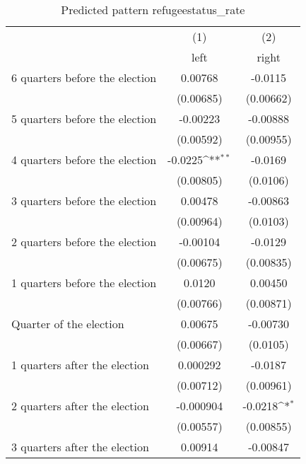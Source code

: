 \begin{table}[htbp]\centering
\def\sym#1{\ifmmode^{#1}\else\(^{#1}\)\fi}
\caption{Predicted pattern refugeestatus\_rate}
\begin{tabular}{l*{2}{c}}
\hline\hline
                    &\multicolumn{1}{c}{(1)}&\multicolumn{1}{c}{(2)}\\
                    &\multicolumn{1}{c}{left}&\multicolumn{1}{c}{right}\\
\hline
 6 quarters before the election&     0.00768         &     -0.0115         \\
                    &   (0.00685)         &   (0.00662)         \\
[1em]
 5 quarters before the election&    -0.00223         &    -0.00888         \\
                    &   (0.00592)         &   (0.00955)         \\
[1em]
 4 quarters before the election&     -0.0225\sym{**} &     -0.0169         \\
                    &   (0.00805)         &    (0.0106)         \\
[1em]
 3 quarters before the election&     0.00478         &    -0.00863         \\
                    &   (0.00964)         &    (0.0103)         \\
[1em]
 2 quarters before the election&    -0.00104         &     -0.0129         \\
                    &   (0.00675)         &   (0.00835)         \\
[1em]
 1 quarters before the election&      0.0120         &     0.00450         \\
                    &   (0.00766)         &   (0.00871)         \\
[1em]
Quarter of the election&     0.00675         &    -0.00730         \\
                    &   (0.00667)         &    (0.0105)         \\
[1em]
 1 quarters after the election&    0.000292         &     -0.0187         \\
                    &   (0.00712)         &   (0.00961)         \\
[1em]
 2 quarters after the election&   -0.000904         &     -0.0218\sym{*}  \\
                    &   (0.00557)         &   (0.00855)         \\
[1em]
 3 quarters after the election&     0.00914         &    -0.00847         \\

\end{tabular}
\end{table}
